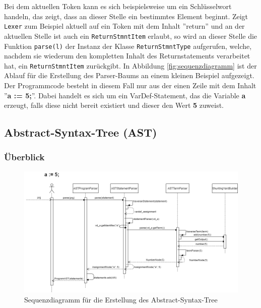 Bei dem aktuellen Token kann es sich beispielsweise um ein Schlüsselwort handeln, das zeigt, dass an dieser Stelle ein bestimmtes Element beginnt.
Zeigt \texttt{Lexer} zum Beispiel aktuell auf ein Token mit dem Inhalt ''return'' und an der aktuellen Stelle ist auch ein \texttt{ReturnStmntItem} erlaubt, so wird an dieser Stelle die Funktion \texttt{parse(l)} der Instanz der Klasse \texttt{ReturnStmntType} aufgerufen, welche, nachdem sie wiederum den kompletten Inhalt des Returnstatements verarbeitet hat, ein \texttt{ReturnStmntItem} zurückgibt.
\newline
\newline
In Abbildung \ref{fig:sequenzdiagramm} ist der Ablauf für die Erstellung des Parser-Baums an einem kleinen Beispiel aufgezeigt. Der Programmcode besteht in diesem Fall nur aus der einen Zeile mit dem Inhalt ''\textbf{a := 5;}''. Dabei handelt es sich um ein VarDef-Statement, das die Variable \textbf{a} erzeugt, falls diese nicht bereit existiert und dieser den Wert \textbf{5} zuweist.


\subsection{Abstract-Syntax-Tree (AST)}\label{subsection:ast}

\subsubsection{Überblick}

\begin{figure}[tbh]
	\hspace{-0.1\linewidth}
	\includegraphics[width=1.2\linewidth]{images/sequenzdiagrammAST}
	\caption[Sequenzdiagramm Parser]{Sequenzdiagramm für die Erstellung des Abstract-Syntax-Tree}
	\label{fig:sequenzdiagrammAST}
\end{figure}

